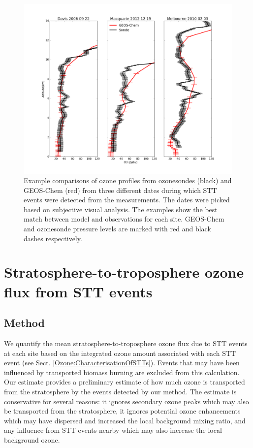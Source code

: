   \begin{figure}
    \includegraphics[width=12cm]{Figures/Ozone/event_profile_comparison.png}
    \caption{%
      Example comparisons of ozone profiles from ozonesondes (black) and GEOS-Chem (red) from three different dates during which STT events were detected from the measurements.
      The dates were picked based on subjective visual analysis. 
      The examples show the best match between model and observations for each site.
      GEOS-Chem and ozonesonde pressure levels are marked with red and black dashes respectively.}
    \label{Ozone:fig:event_profile_comparison}
  \end{figure}
  
\section{Stratosphere-to-troposphere ozone flux from STT events}
  \label{Ozone:STTevents}
  
  \subsection{Method}
    \label{Ozone:fluxcalc}
    We quantify the mean stratosphere-to-troposphere ozone flux due to STT events at each site based on the integrated ozone amount associated with each STT event (see Sect. \ref{Ozone:CharacterisationOfSTTs}).
    Events that may have been influenced by transported biomass burning are excluded from this calculation.
    Our estimate provides a preliminary estimate of how much ozone is transported from the stratosphere by the events detected by our method.
    The estimate is conservative for several reasons: it ignores secondary ozone peaks which may also be transported from the stratosphere, it ignores potential ozone enhancements which may have dispersed and increased the local background mixing ratio, and any influence from STT events nearby which may also increase the local background ozone.
    
